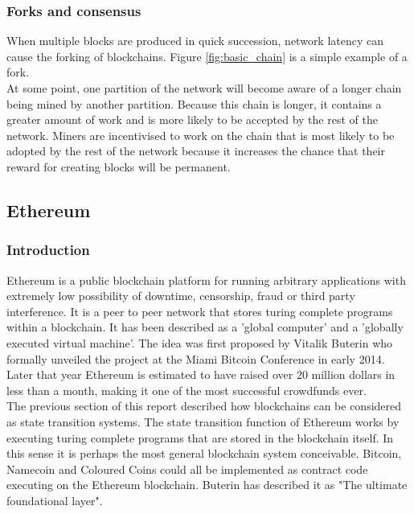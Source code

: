\subsubsection{Forks and consensus}
When multiple blocks are produced in quick succession, network latency can cause the forking of blockchains. Figure \ref{fig:basic_chain} is a simple example of a fork. \\

At some point, one partition of the network will become aware of a longer chain being mined by another partition. Because this chain is longer, it contains a greater amount of work and is more likely to be accepted by the rest of the network. Miners are incentivised to work on the chain that is most likely to be adopted by the rest of the network because it increases the chance that their reward for creating blocks will be permanent.\\

\subsection{Ethereum}
\subsubsection{Introduction}
Ethereum is a public blockchain platform for running arbitrary applications with extremely low possibility of downtime, censorship, fraud or third party interference. It is a peer to peer network that stores turing complete programs within a blockchain. It has been described as a 'global computer' and a 'globally executed virtual machine'. The idea was first proposed by Vitalik Buterin who formally unveiled the project at the Miami Bitcoin Conference in early 2014. Later that year Ethereum is estimated to have raised over 20 million dollars in less than a month, making it one of the most successful crowdfunds ever\cite{Ethereum_crowdfund}. \\

The previous section of this report described how blockchains can be considered as state transition systems. The state transition function of Ethereum works by executing turing complete programs that are stored in the blockchain itself. In this sense it is perhaps the most general blockchain system conceivable. Bitcoin, Namecoin and Coloured Coins could all be implemented as contract code executing on the Ethereum blockchain. Buterin has described it as "The ultimate foundational layer"\cite{Ethereum}. \\

